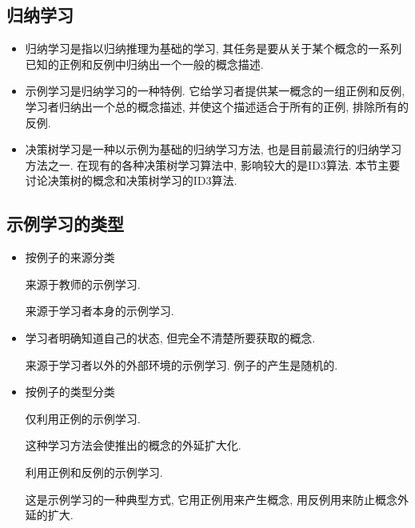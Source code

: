 \subsection{归纳学习}
\begin{itemize}
\item 归纳学习是指以归纳推理为基础的学习, 其任务是要从关于某个概念的一系列已知的正例和反例中归纳出一个一般的概念描述.
\item 示例学习是归纳学习的一种特例. 它给学习者提供某一概念的一组正例和反例, 学习者归纳出一个总的概念描述, 并使这个描述适合于所有的正例, 排除所有的反例.
\item 决策树学习是一种以示例为基础的归纳学习方法, 也是目前最流行的归纳学习方法之一. 在现有的各种决策树学习算法中, 影响较大的是ID3算法. 本节主要讨论决策树的概念和决策树学习的ID3算法.
\end{itemize}
\subsection{示例学习的类型}
\begin{itemize}
\item 按例子的来源分类

   来源于教师的示例学习.

   来源于学习者本身的示例学习.
\item 学习者明确知道自己的状态, 但完全不清楚所要获取的概念.

     来源于学习者以外的外部环境的示例学习. 例子的产生是随机的.
\item 按例子的类型分类

     仅利用正例的示例学习.

    这种学习方法会使推出的概念的外延扩大化.

     利用正例和反例的示例学习.

    这是示例学习的一种典型方式, 它用正例用来产生概念, 用反例用来防止概念外延的扩大.
\end{itemize}
